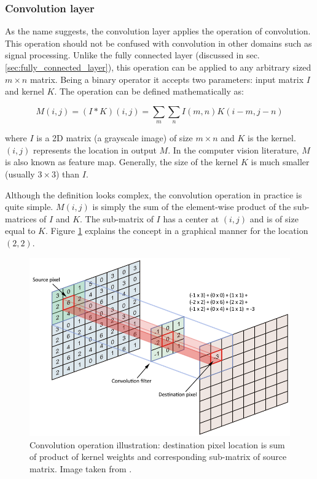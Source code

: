 \subsubsection{Convolution layer}
As the name suggests, the convolution layer applies the operation of convolution. This operation should not be confused with convolution in other domains such as signal processing. Unlike the fully connected layer (discussed in sec. \ref{sec:fully_connected_layer}), this operation can be applied to any arbitrary sized $m \times n$ matrix. Being a binary operator it accepts two parameters: input matrix $I$ and kernel $K$. The operation can be defined mathematically as:

$$ M(i,j)=(I*K)(i,j)=\sum_m\sum_n I(m,n)K(i-m,j-n)$$

where $I$ is a 2D matrix (a grayscale image) of size $m \times n$ and $K$ is the kernel\cite{goodfellow2016deep}. $(i,j)$ represents the location in output $M$. In the computer vision literature, $M$ is also known as feature map. Generally, the size of the kernel $K$ is much smaller (usually $3\times 3$) than $I$.

Although the definition looks complex, the convolution operation in practice is quite simple. $M(i,j)$ is simply the sum of the element-wise product of the sub-matrices of $I$ and $K$. The sub-matrix of $I$ has a center at $(i,j)$ and is of size equal to $K$. Figure \ref{fig:convolution-op} explains the concept in a graphical manner for the location $(2,2)$.


\begin{figure}
    \centering
    \includegraphics[width=0.8\linewidth]{images/convolution-op.png}
    \caption[Convolution operation]{Convolution operation illustration: destination pixel location is sum of product of kernel weights and corresponding sub-matrix of source matrix. Image taken from \cite{convolution-op}.}
    \label{fig:convolution-op}
\end{figure}

